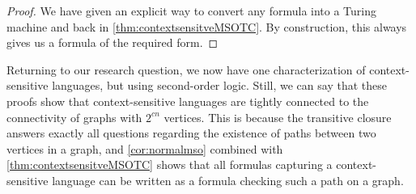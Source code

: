 \begin{proof}
    We have given an explicit way to convert any formula into a Turing machine and back in \cref{thm:contextsensitveMSOTC}.
    By construction, this always gives us a formula of the required form.
\end{proof}

Returning to our research question, we now have one characterization of context-sensitive languages, but using second-order logic.
Still, we can say that these proofs show that context-sensitive languages are tightly connected to the connectivity of graphs with $2^{cn}$ vertices.
This is because the transitive closure answers exactly all questions regarding the existence of paths between two vertices in a graph, and \cref{cor:normalmso} combined with \cref{thm:contextsensitveMSOTC} shows that all formulas capturing a context-sensitive language can be written as a formula checking such a path on a graph.
